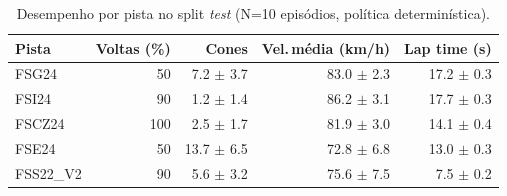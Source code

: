 \begin{table}[H]
\centering
\caption{Desempenho por pista no split \textit{test} (N=10 episódios, política determinística).}
\label{tab:per_track_test}
\begin{tabular}{lrrrr}
\toprule
\textbf{Pista} & \textbf{Voltas (\%)} & \textbf{Cones} & \textbf{Vel.\,m\'edia (km/h)} & \textbf{Lap time (s)} \\
\midrule
FSG24 & 50 & 7.2 $\pm$ 3.7 & 83.0 $\pm$ 2.3 & 17.2 $\pm$ 0.3 \\
FSI24 & 90 & 1.2 $\pm$ 1.4 & 86.2 $\pm$ 3.1 & 17.7 $\pm$ 0.3 \\
FSCZ24 & 100 & 2.5 $\pm$ 1.7 & 81.9 $\pm$ 3.0 & 14.1 $\pm$ 0.4 \\
FSE24 & 50 & 13.7 $\pm$ 6.5 & 72.8 $\pm$ 6.8 & 13.0 $\pm$ 0.3 \\
FSS22_V2 & 90 & 5.6 $\pm$ 3.2 & 75.6 $\pm$ 7.5 & 7.5 $\pm$ 0.2 \\
\bottomrule
\end{tabular}
\end{table}
